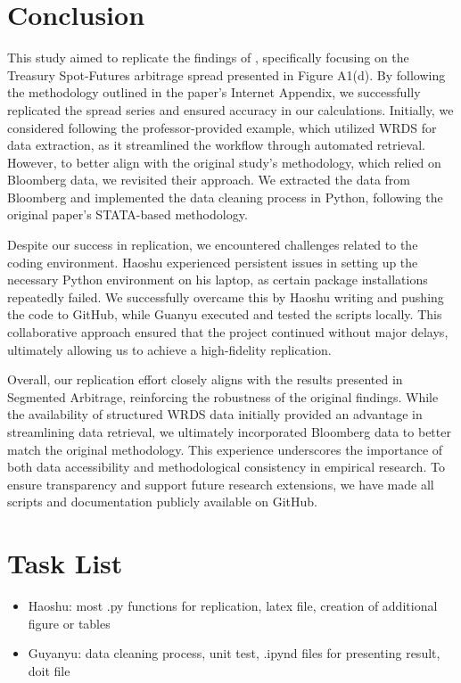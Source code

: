 \documentclass{article}
\begin{document}
\section{Conclusion}
This study aimed to replicate the findings of \cite{siriwardane2023segmented}, specifically focusing on the Treasury Spot-Futures arbitrage spread presented in Figure A1(d). By following the methodology outlined in the paper’s Internet Appendix, we successfully replicated the spread series and ensured accuracy in our calculations. Initially, we considered following the professor-provided example, which utilized WRDS for data extraction, as it streamlined the workflow through automated retrieval. However, to better align with the original study’s methodology, which relied on Bloomberg data, we revisited their approach. We extracted the data from Bloomberg and implemented the data cleaning process in Python, following the original paper’s STATA-based methodology.

Despite our success in replication, we encountered challenges related to the coding environment. Haoshu experienced persistent issues in setting up the necessary Python environment on his laptop, as certain package installations repeatedly failed. We successfully overcame this by Haoshu writing and pushing the code to GitHub, while Guanyu executed and tested the scripts locally. This collaborative approach ensured that the project continued without major delays, ultimately allowing us to achieve a high-fidelity replication.

Overall, our replication effort closely aligns with the results presented in Segmented Arbitrage, reinforcing the robustness of the original findings. While the availability of structured WRDS data initially provided an advantage in streamlining data retrieval, we ultimately incorporated Bloomberg data to better match the original methodology. This experience underscores the importance of both data accessibility and methodological consistency in empirical research. To ensure transparency and support future research extensions, we have made all scripts and documentation publicly available on GitHub.

\section{Task List}

\begin{itemize}
    \item Haoshu: most .py functions for replication, latex file, creation of additional figure or tables
    \item Guyanyu: data cleaning process, unit test, .ipynd files for presenting result, doit file
\end{itemize}












\clearpage






\end{document}
